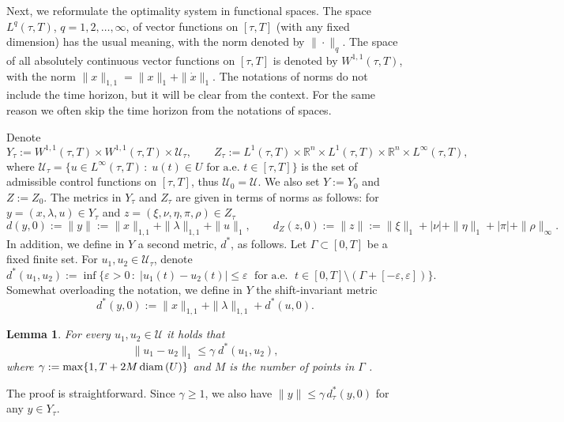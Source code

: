 \documentclass[11pt]{article}
\newtheorem{lem}[theo]{Lemma}
\newcommand{\bd}{\begin{displaymath}}
\newcommand{\ed}{\end{displaymath}}
\newcommand{\be}{\begin{equation}}
\newcommand{\ee}{\end{equation}}
\newcommand{\R}{\mathbb R}
\newcommand{\st}{\subset}
\newcommand{\sm}{\setminus}
\newcommand{\U}{\mathcal U}
\newcommand{\e}{\varepsilon}
\newcommand{\sth}{ \, :\;}
\newcommand{\dd}{\mbox{\rm\,d}}
\def\R{\mathbb{R}}
\begin{document}
Next, we reformulate the optimality system in functional spaces. 
The space $L^q(\tau,T)$, $q =1, 2, \ldots, \infty$, of vector functions on $[\tau,T]$ (with any fixed dimension)
has the usual meaning, with the norm denoted by $\| \cdot \|_q$.  The space of all absolutely continuous vector functions
on $[\tau,T]$  is denoted by $W^{1,1}(\tau,T)$, with the norm $\| x \|_{1,1} = \| x \|_1 + \| \dot x \|_1$.
The notations of norms do not include the time horizon, but it will be clear from the context.
For the same reason we often skip the time horizon from the notations of spaces.

Denote
\bd
       Y_\tau := W^{1,1}(\tau, T) \times W^{1,1}(\tau,T) \times \U_\tau, 
          \qquad Z_\tau := L^1(\tau,T) \times \R^n \times L^1(\tau,T)\times\mathbb R^n\times L^\infty(\tau,T),    
\ed
where $\U_\tau = \{ u \in L^\infty(\tau,T) \sth u(t) \in U \mbox{ for a.e. } t \in [\tau,T]\}$ is the set of admissible control functions 
on $[\tau,T]$, thus $\U_0 = \U$. We also set $Y := Y_0$ and $Z := Z_0$.
The metrics in $Y_\tau$ and $Z_\tau$
are given in terms of norms as follows: for $y = (x,\lambda,u) \in Y_\tau$ and $z = (\xi, \nu, \eta,\pi, \rho) \in Z_\tau$
\bd
       d(y,0) := \| y \| := \| x \|_{1,1} + \| \lambda \|_{1,1} + \| u \|_1, \qquad
        d_Z(z,0) := \| z \|  := \| \xi \|_{1} + | \nu | + \| \eta \|_{1} +  |\pi|+ \| \rho \|_\infty.
\ed
In addition, we define in $Y$ a second metric, $d^*$, as follows. 
Let $\Gamma \st [0,T]$ be a fixed finite set.
For $u_1, u_2 \in \U_\tau$, denote 
\be\label{EGam0}
    d^*(u_1,u_2) := \inf \{ \e > 0 \sth |u_1(t) - u_2(t) | \leq \e \; 
    \mbox{ for a.e. } \; t \in [0,T] \sm (\Gamma + [-\e,\e]) \}.
\ee 
Somewhat overloading the notation, we define in $Y$ the shift-invariant metric
\bd%
          d^*(y,0) := \| x \|_{1,1} + \| \lambda \|_{1,1} + d^*(u,0).
\ed

\begin{lem} \label{L_d<d}
For every $u_1, u_2 \in \U$ it holds that
\bd
    \| u_1 - u_2 \|_1 \leq \gamma \; d^*(u_1,u_2), 
\ed
where $\gamma := \max\{ 1, T+2M \, {\rm diam} \,(U)\}$ and $M$ is the number of points in $\Gamma$ . 
\end{lem}

The proof is straightforward. 
Since $\gamma \geq 1$, we also have $\| y \| \leq \gamma \, d^*_\tau(y,0)$ for any $y \in Y_\tau$.
\end{document}
